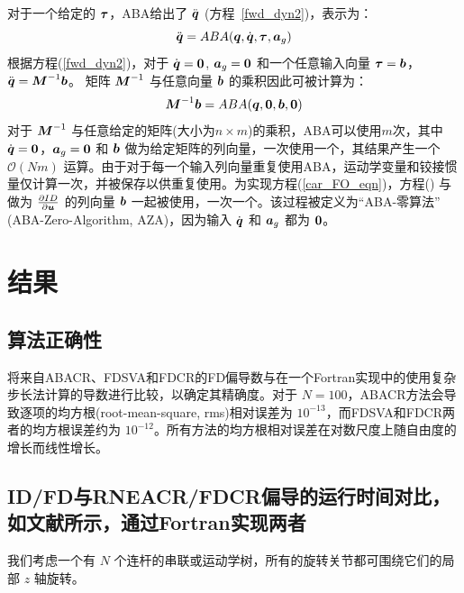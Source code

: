 \documentclass[letterpaper, 10 pt, conference]{ieeetran}  %
\begin{document}
对于一个给定的 $\boldsymbol{\tau}$，ABA给出了 $\ddot{\boldsymbol{q}}$ (方程~\ref{fwd_dyn2})，表示为：
\begin{equation}
       \qdd = ABA(\q,\qd,\taubar,\a_g)
    \label{ABA_eqn_1}
\end{equation}
%
根据方程(\ref{fwd_dyn2})，对于 $\dot{\boldsymbol{q}}=\bf{0}$, $\boldsymbol{a}_g=\bf{0}$ 和一个任意输入向量 $\boldsymbol{\tau}=\boldsymbol{b}$，
$
     \qdd = \M^{-1} \b
    \label{fwd_dyn3}
    $。
矩阵 $\boldsymbol{M}^{-1}$ 与任意向量 $\boldsymbol{b}$ 的乘积因此可被计算为： %
\begin{equation}
       \M^{-1} \b  = ABA(\q,\bf{0},\b, \bf{0})
    \label{ABA_eqn_2}
\end{equation}
对于 $\boldsymbol{M}^{-1}$ 与任意给定的矩阵(大小为$n \times m$)的乘积，ABA可以使用$m$次，其中$\dot{\boldsymbol{q}}=\bf{0}$，$\boldsymbol{a}_g=\bf{0}$ 和 $\boldsymbol{b}$ 做为给定矩阵的列向量，一次使用一个，其结果产生一个 $\mathcal{O}(Nm)$ 运算。由于对于每一个输入列向量重复使用ABA，运动学变量和铰接惯量仅计算一次，并被保存以供重复使用。为实现方程(\ref{car_FO_eqn})，方程(\red{~\ref{ABA_eqn_2}}) 与做为 $\frac{\partial ID }{\partial \boldsymbol{u}}$ 的列向量 $\boldsymbol{b}$ 一起被使用，一次一个。该过程被定义为“ABA-零算法” (ABA-Zero-Algorithm, AZA)，因为输入 $\dot{\boldsymbol{q}}$ 和 $\boldsymbol{a}_g$ 都为 $\bf{0}$。

\section{结果}

\subsection{算法正确性}
 将来自ABACR、FDSVA和FDCR的FD偏导数与在一个Fortran实现中的使用复杂步长法计算的导数进行比较，以确定其精确度。对于 $N=100$，ABACR方法会导致逐项的均方根(root-mean-square, rms)相对误差为 $10^{-13}$，而FDSVA和FDCR两者的均方根误差约为 $10^{-12}$。所有方法的均方根相对误差在对数尺度上随自由度的增长而线性增长。 %
 

\subsection{ID/FD与RNEACR/FDCR偏导的运行时间对比，如文献\cite{car}所示，通过Fortran实现两者}

我们考虑一个有 $N$ 个连杆的串联或运动学树，所有的旋转关节都可围绕它们的局部 $z$ 轴旋转。
\end{document}

